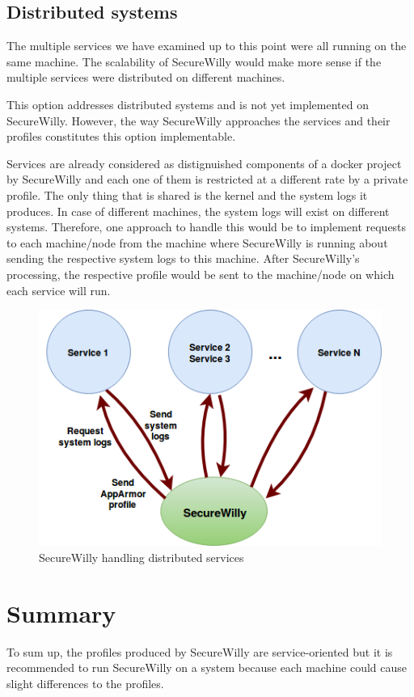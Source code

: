 \subsection{Distributed systems}
The multiple services we have examined up to this point were all running on the same machine. The scalability of SecureWilly would make more sense if the multiple services were distributed on different machines.

This option addresses distributed systems and is not yet implemented on SecureWilly. However, the way SecureWilly approaches the services and their profiles constitutes this option implementable.

Services are already considered as distignuished components of a docker project by SecureWilly and each one of them is restricted at a different rate by a private profile. The only thing that is shared is the kernel and the system logs it produces. In case of different machines, the system logs will exist on different systems. Therefore, one approach to handle this would be to implement requests to each machine/node from the machine where SecureWilly is running about sending the respective system logs to this machine. After SecureWilly's processing, the respective profile would be sent to the machine/node on which each service will run.

\begin{figure}[h!]
  \centering
   \includegraphics[width=0.68\linewidth]{figures/DistributedSystems.png}
   \caption{SecureWilly handling distributed services}
\end{figure}

\section{Summary}
To sum up, the profiles produced by SecureWilly are service-oriented but it is recommended to run SecureWilly on a system because each machine could cause slight differences to the profiles.

